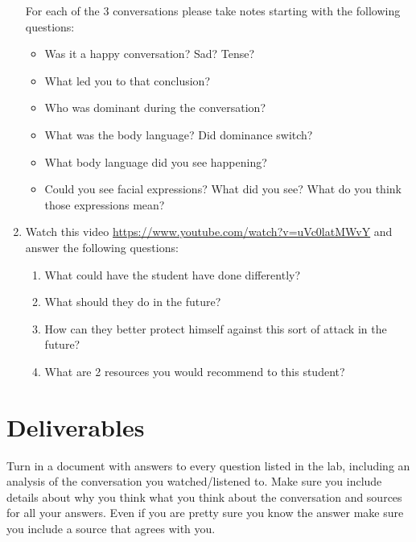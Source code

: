 \documentclass[12pt]{article}
\begin{document}
\begin{enumerate}
\begin{itemize}
        \end{itemize}
        For each of the 3 conversations please take notes starting with the following questions:
        \begin{itemize}
            \item Was it a happy conversation? Sad? Tense?
            \item What led you to that conclusion?
            \item Who was dominant during the conversation?
            \item  What was the body language? Did dominance switch?
            \item What body language did you see happening?
            \item Could you see facial expressions? What did you see? What do you think those expressions mean?
        \end{itemize}
    
        
        \item Watch this video  \url{https://www.youtube.com/watch?v=uVc0latMWvY}    and answer the following questions:
        \begin{enumerate}
            \item What could have the student have done differently?
            \item What should they do in the future?
            \item How can they better protect himself against this sort of attack in the future?
            \item What are 2 resources you would recommend to this student?
        \end{enumerate}
          
        
    \end{enumerate}



\section*{Deliverables}
Turn in a document with answers to every question listed in the lab, including an analysis of the conversation you watched/listened to. Make sure you include details about why you think what you think about the conversation and sources for all your answers.  Even if you are pretty sure you know the answer make sure you include a source that agrees with you.
\end{document}
